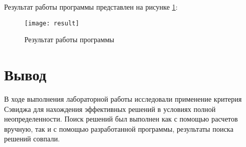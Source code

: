 \documentclass[a4paper,14pt]{extarticle}
\begin{document}
Результат работы программы представлен на рисунке \ref{fig:result}:

\begin{figure}[H]
    \centering
    \texttt{[image: result]}
    \caption{Результат работы программы}
    \label{fig:result}
\end{figure}

\section*{Вывод}
В ходе выполнения лабораторной работы исследовали применение критерия Сэвиджа
для нахождения эффективных решений в условиях полной неопределенности. Поиск
решений был выполнен как с помощью расчетов вручную, так и с помощью
разработанной программы, результаты поиска решений совпали.
\end{document}
